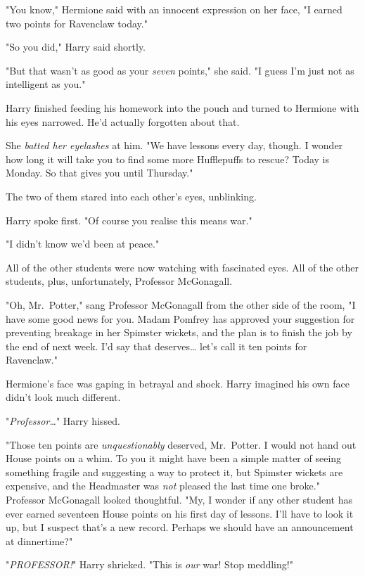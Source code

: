 "You know," Hermione said with an innocent expression on her face, "I earned 
two points for Ravenclaw today."

"So you did," Harry said shortly.

"But that wasn't as good as your \emph{seven} points," she said. "I guess I'm 
just not as intelligent as you."

Harry finished feeding his homework into the pouch and turned to Hermione with 
his eyes narrowed. He'd actually forgotten about that.

She \emph{batted her eyelashes} at him. "We have lessons every day, though. I 
wonder how long it will take you to find some more Hufflepuffs to rescue? Today 
is Monday. So that gives you until Thursday."

The two of them stared into each other's eyes, unblinking.

Harry spoke first. "Of course you realise this means war."

"I didn't know we'd been at peace."

All of the other students were now watching with fascinated eyes. All of the 
other students, plus, unfortunately, Professor McGonagall.

"Oh, Mr.~Potter," sang Professor McGonagall from the other side of the room, "I 
have some good news for you. Madam Pomfrey has approved your suggestion for 
preventing breakage in her Spimster wickets, and the plan is to finish the job 
by the end of next week. I'd say that deserves{\ldots} let's call it ten points 
for Ravenclaw."

Hermione's face was gaping in betrayal and shock. Harry imagined his own face 
didn't look much different.

"\emph{Professor{\ldots}}" Harry hissed.

"Those ten points are \emph{unquestionably} deserved, Mr.~Potter. I would not 
hand out House points on a whim. To you it might have been a simple matter of 
seeing something fragile and suggesting a way to protect it, but Spimster 
wickets are expensive, and the Headmaster was \emph{not} pleased the last time 
one broke." Professor McGonagall looked thoughtful. "My, I wonder if any other 
student has ever earned seventeen House points on his first day of lessons. 
I'll have to look it up, but I suspect that's a new record. Perhaps we should 
have an announcement at dinnertime?"

"\emph{PROFESSOR!}" Harry shrieked. "This is \emph{our} war! Stop meddling!"

